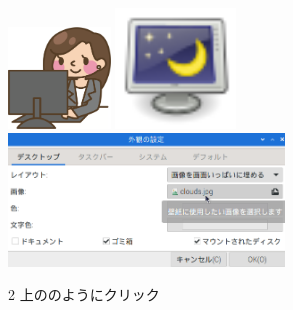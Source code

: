 \documentclass[a4paper,12pt]{jarticle}
\begin{document}
\begin{figure}
\begin{minipage}{\textwidth}
\begin{minipage}{2.582cm}
    \end{minipage}
    \begin{minipage}{0.45\textwidth}
      \includegraphics[width=2.712cm]{textbook-img082.png}
      \hfill
      \includegraphics[width=3.193cm]{textbook-img106.png}\\
      \includegraphics[width=7.324cm]{textbook-img108.png}\\
      \begin{minipage}{8.035cm}
        2 上ののようにクリック
      \end{minipage}
    \end{minipage}

  \end{minipage}

  \begin{minipage}{\textwidth}


\end{minipage}
\end{figure}
\end{document}
